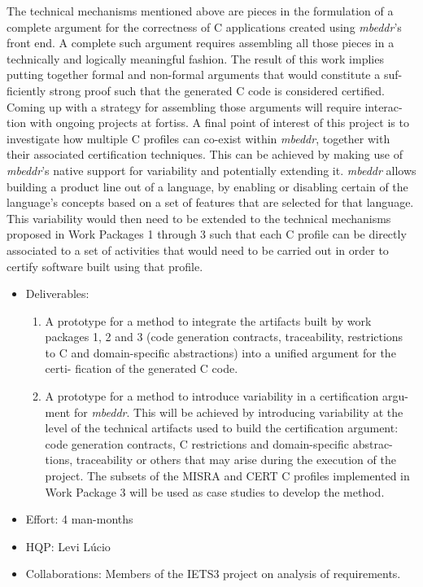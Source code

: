 The technical mechanisms mentioned above are pieces in the formulation of a
complete argument for the correctness of C applications created using \emph{mbeddr}’s
front end. A complete such argument requires assembling all those pieces in a
technically and logically meaningful fashion. The result of this work implies
putting together formal and non-formal arguments that would constitute a suf-
ficiently strong proof such that the generated C code is considered certified.
Coming up with a strategy for assembling those arguments will require interac-
tion with ongoing projects at fortiss.
A final point of interest of this project is to investigate how multiple C
profiles can co-exist within \emph{mbeddr}, together with their associated
certification techniques. This can be achieved by making use of \emph{mbeddr}’s native
support for variability and potentially extending it. \emph{mbeddr} allows building a
product line out of a language, by enabling or disabling certain of the
language’s concepts based on a set of features that are selected for that
language. This variability would then need to be extended to the technical
mechanisms proposed in Work Packages 1 through 3 such that each C profile can be
directly associated to a set of activities that would need to be carried out in
order to certify software built using that profile.

\begin{itemize}
  \item Deliverables:
  \begin{enumerate}
    \item A prototype for a method to integrate the artifacts built by work
    packages 1, 2 and 3 (code generation contracts, traceability, restrictions to C and
domain-specific abstractions) into a unified argument for the certi- fication of
the generated C code.
\item A prototype for a method to introduce variability in a certification argu-
ment for \emph{mbeddr}. This will be achieved by introducing variability at the level
of the technical artifacts used to build the certification argument: code
generation contracts, C restrictions and domain-specific abstrac- tions,
traceability or others that may arise during the execution of the project. The
subsets of the MISRA and CERT C profiles implemented in Work Package 3 will be
used as case studies to develop the method.
  \end{enumerate}
  \item Effort: 4 man-months
  \item HQP: Levi L\'ucio
  \item Collaborations: Members of the IETS3 project on analysis of
  requirements.
\end{itemize}